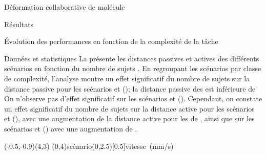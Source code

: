\documentclass[myfrancais,ngerman,english,french]{mythesis}
\begin{document}
\begin{mychapter}{Déformation collaborative de molécule}
\begin{mysection}{Résultats}
\begin{mysubsection}{Évolution des performances en fonction de la complexité de la tâche}
\begin{mysubsubsection}{Données et statistiques}
					La  présente les distances passives  et actives  des différents scénarios  en fonction du nombre de sujets .
					En regroupant les scénarios par classe de complexité, l'analyse montre un effet significatif du nombre de sujets  sur la distance passive  pour les scénarios  et  (); la distance passive des  est inférieure de 
					On n'observe pas d'effet significatif sur les scénarios  et  ().
					Cependant, on constate un effet significatif du nombre de sujets  sur la distance active  pour les scénarios  et  (), avec une augmentation de la distance active pour les  de , ainsi que sur les scénarios  et  () avec une augmentation de .

					\begin{myfigure}
						\begin{myps}(-0.5,-0.9)(4,3)
							\myaxes(0,4){scénario}(0,2.5)[0.5]{vitesse~(mm/s)}
						\end{myps}
					\end{myfigure}


\end{mysubsubsection}
\end{mysubsection}
\end{mysection}
\end{mychapter}
\end{document}
